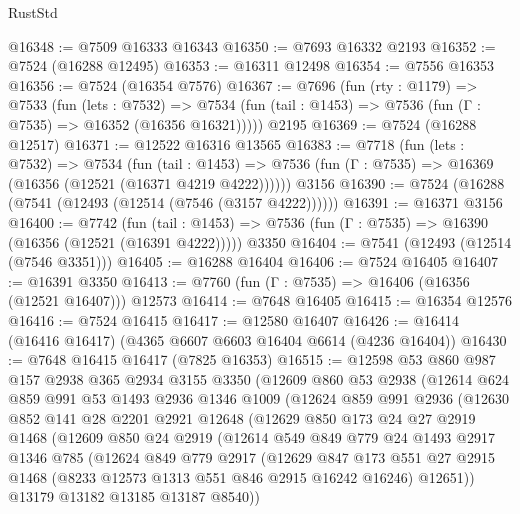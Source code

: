 \begin{lexlean}{RustStd}
\begin{coremodule}
@16348 := @7509 @16333 @16343
@16350 := @7693 @16332 @2193
@16352 := @7524 (@16288 @12495)
@16353 := @16311 @12498
@16354 := @7556 @16353
@16356 := @7524 (@16354 @7576)
@16367 := @7696
    (fun (rty : @1179) =>
    @7533
      (fun (lets : @7532) =>
      @7534 (fun (tail : @1453) => @7536 (fun (Γ : @7535) => @16352 (@16356 @16321)))))
    @2195
@16369 := @7524 (@16288 @12517)
@16371 := @12522 @16316 @13565
@16383 := @7718
    (fun (lets : @7532) =>
    @7534
      (fun (tail : @1453) =>
      @7536 (fun (Γ : @7535) => @16369 (@16356 (@12521 (@16371 @4219 @4222))))))
    @3156
@16390 := @7524 (@16288 (@7541 (@12493 (@12514 (@7546 (@3157 @4222))))))
@16391 := @16371 @3156
@16400 := @7742
    (fun (tail : @1453) => @7536 (fun (Γ : @7535) => @16390 (@16356 (@12521 (@16391 @4222)))))
    @3350
@16404 := @7541 (@12493 (@12514 (@7546 @3351)))
@16405 := @16288 @16404
@16406 := @7524 @16405
@16407 := @16391 @3350
@16413 := @7760 (fun (Γ : @7535) => @16406 (@16356 (@12521 @16407))) @12573
@16414 := @7648 @16405
@16415 := @16354 @12576
@16416 := @7524 @16415
@16417 := @12580 @16407
@16426 := @16414 (@16416 @16417) (@4365 @6607 @6603 @16404 @6614 (@4236 @16404))
@16430 := @7648 @16415 @16417 (@7825 @16353)
@16515 := @12598
    @53
    @860
    @987
    @157
    @2938
    @365
    @2934
    @3155
    @3350
    (@12609
      @860
      @53
      @2938
      (@12614
        @624
        @859
        @991
        @53
        @1493
        @2936
        @1346
        @1009
        (@12624
          @859
          @991
          @2936
          (@12630
            @852
            @141
            @28
            @2201
            @2921
            @12648
            (@12629
              @850
              @173
              @24
              @27
              @2919
              @1468
              (@12609
                @850
                @24
                @2919
                (@12614
                  @549
                  @849
                  @779
                  @24
                  @1493
                  @2917
                  @1346
                  @785
                  (@12624
                    @849
                    @779
                    @2917
                    (@12629
                      @847
                      @173
                      @551
                      @27
                      @2915
                      @1468
                      (@8233 @12573 @1313 @551 @846 @2915 @16242 @16246)
                      @12651))
                  @13179
                  @13182
                  @13185
                  @13187
                  @8540))

\end{coremodule}
\end{lexlean}
